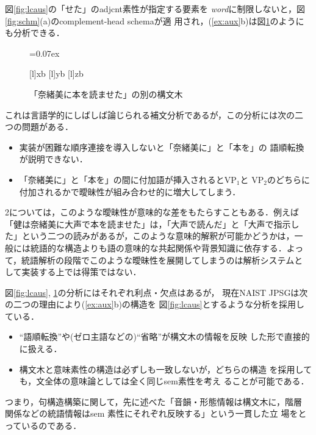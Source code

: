 図\ref{fig:lcaus}の「せた」の{\sc adjcnt}素性が指定する要素を{\it
word\/}に制限しないと，図\ref{fig:schm}(a)のcomplement-head schemaが適
用され，(\ref{ex:aux}b)は図\ref{fig:scaus}のようにも分析できる．
\begin{figure}
\begin{center}
\unitlength=0.07ex
 \hspace*{1cm}
\end{center}
[l]{xb}
[l]{yb}
[l]{zb}
\caption{「奈緒美に本を読ませた」の別の構文木}\label{fig:scaus}
\end{figure}
これは言語学的にしばしば論じられる補文分析であるが，この分析には次の二
つの問題がある．
\begin{itemize}
\item [1.] 実装が困難な順序連接を導入しないと「奈緒美に」と「本を」の
      語順転換が説明できない．
\item [2.] 「奈緒美に」と「本を」の間に付加語が挿入されるとVP$_1$と
      VP$_2$のどちらに付加されるかで曖昧性が組み合わせ的に増大してしまう．
\end{itemize}
2については，このような曖昧性が意味的な差をもたらすこともある．例えば
「健は奈緒美に大声で本を読ませた」は，「大声で読んだ」と「大声で指示し
た」という二つの読みがあるが，このような意味的解釈が可能かどうかは，一
般には統語的な構造よりも語の意味的な共起関係や背景知識に依存する．よっ
て，統語解析の段階でこのような曖昧性を展開してしまうのは解析システムと
して実装する上では得策ではない．

図\ref{fig:lcaus}, \ref{fig:scaus}の分析にはそれぞれ利点・欠点はあるが，
現在NAIST JPSGは次の二つの理由により(\ref{ex:aux}b)の構造を
図\ref{fig:lcaus}とするような分析を採用している．
\begin{itemize}
\item [1.] ``語順転換''や(ゼロ主語などの)``省略''が構文木の情報を反映
      した形で直接的に扱える．
\item [2.] 構文木と意味素性の構造は必ずしも一致しないが，どちらの構造
      を採用しても，文全体の意味論としては全く同じ{\sc sem}素性を考え
      ることが可能である．
\end{itemize}
つまり，句構造構築に関して，先に述べた「音韻・形態情報は構文木に，階層
関係などの統語情報は{\sc sem} 素性にそれぞれ反映する」という一貫した立
場をとっているのである．


